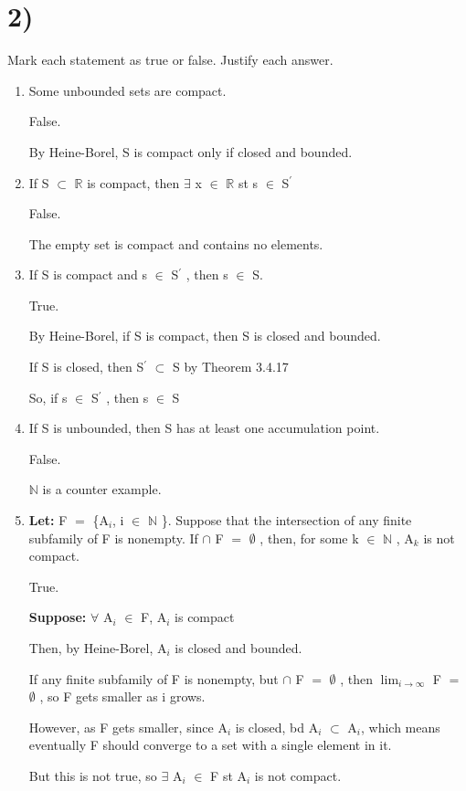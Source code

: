 \documentclass{article}
\newcommand{\mt}[1]{\ensuremath{#1}}
\newcommand\bsc[2][\DefaultOpt]{%
  \def\DefaultOpt{#2}%
  \section[#1]{#2}%
}
\newcommand{\balist}{\begin{enumerate}[label=\alph*.]}
\newcommand{\elist}{\end{enumerate}}
\newcommand{\lt}[1]{\textbf{Let: } #1}
\newcommand{\supp}[1]{\textbf{Suppose: } #1}
\newcommand{\br}{\mt{\mathbb{R}} }       %
\newcommand{\bn}{\mt{\mathbb{N}} }       %
\newcommand{\fa}{\mt{\forall} }          %
\newcommand{\mem}{\mt{\in} }
\newcommand{\exs}{\mt{\exists} }
\newcommand{\es}{\mt{\emptyset} }        %
\newcommand{\sbs}{\mt{\subset} }         %
\newcommand{\eql}{\mt{=} }
\newcommand{\pr}{\mt{^\prime} } 		   %
\newcommand{\uw}[2]{#1\mt{_{#2}}}
\newcommand{\lmti}[1]{\mt{\displaystyle{\lim_{#1 \to \infty}}}}
\begin{document}
\bsc{2)}{
Mark each statement as true or false. Justify each answer.

\balist
\item Some unbounded sets are compact.

	False.
	
	By Heine-Borel, S is compact only if closed and bounded.
	
\item If S \sbs \br is compact, then \exs x \mem \br st s \mem S\pr
	
	False.
	
	The empty set is compact and contains no elements.
	
\item If S is compact and s \mem S\pr, then s \mem S.
	
	True.
	
	By Heine-Borel, if S is compact, then S is closed and bounded.
	
	If S is closed, then S\pr \sbs S by Theorem 3.4.17
	
	So, if s \mem S\pr, then s \mem S
	
\item If S is unbounded, then S has at least one accumulation point.
	
	False.
	
	\bn is a counter example.
\item \lt{F \eql \{\uw{A}{i}, i \mem \bn\}}. Suppose that the intersection of any finite subfamily of F is nonempty. If $\cap$ F \eql \es, then, for some k \mem \bn, \uw{A}{k} is not compact.
	
	True.
	
	\supp{\fa \uw{A}{i} \mem F, \uw{A}{i} is compact}
	
	Then, by Heine-Borel, \uw{A}{i} is closed and bounded.
	
	If any finite subfamily of F is nonempty, but $\cap$ F \eql \es, then \lmti{i} F \eql \es, so F gets smaller as i grows.
	
	However, as F gets smaller, since \uw{A}{i} is closed, bd \uw{A}{i} \sbs \uw{A}{i}, which means eventually F should converge to a set with a single element in it.
	
	But this is not true, so \exs \uw{A}{i} \mem F st \uw{A}{i} is not compact.
	
\elist


}
\end{document}
